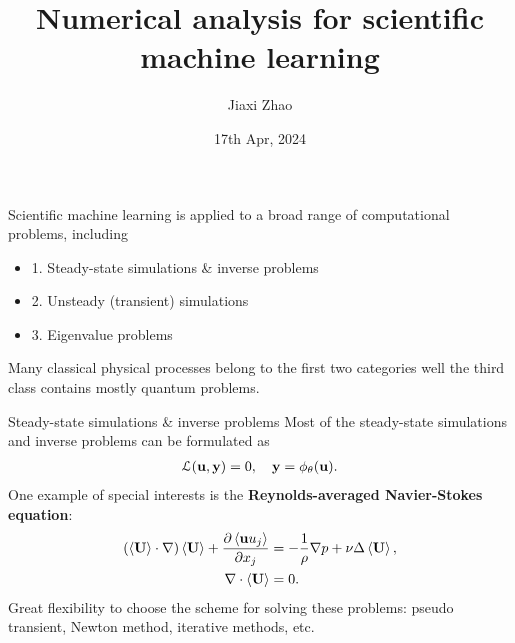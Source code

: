 \documentclass{beamer}
\title[SciML]{Numerical analysis for scientific machine learning}
\author[J. Zhao]{Jiaxi Zhao}
\date{17th Apr, 2024}
\begin{document}
\par \setlength{\parindent}{2em}

\begin{frame}
\titlepage

\end{frame}

\begin{frame}
	Scientific machine learning is applied to a broad range of computational problems, including
	\begin{itemize}
		\item 1. Steady-state simulations \& inverse problems
		\item 2. Unsteady (transient) simulations
		\item 3. Eigenvalue problems
	\end{itemize}
	Many classical physical processes belong to the first two categories well the third class contains mostly quantum problems.
\end{frame}

\begin{frame}{Steady-state simulations \& inverse problems}
	Most of the steady-state simulations and inverse problems can be formulated as 
	\begin{equation*}
		\begin{aligned}
			\mathcal{L}(\mathbf{u}, \mathbf{y}) = 0, 	\quad \mathbf{y}= \phi_{\theta}(\mathbf{u}).
		\end{aligned}
	\end{equation*}
	One example of special interests is the \textbf{Reynolds-averaged Navier-Stokes equation}:
	\begin{equation*}
		\begin{aligned}
	(\left\langle \mathbf{U} \right\rangle \cdot \nabla)\left\langle \mathbf{U} \right\rangle + \frac{\partial \left\langle \mathbf{u} u_j \right\rangle}{\partial x_j} &= -\frac{1}{\rho}\nabla p + \nu \Delta \left\langle \mathbf{U} \right\rangle,		\\
	\nabla \cdot \left\langle \mathbf{U} \right\rangle &= 0.
	\end{aligned}
	\end{equation*}
	Great flexibility to choose the scheme for solving these problems: pseudo transient, Newton method,
	iterative methods, etc.
\end{frame}
\end{document}
